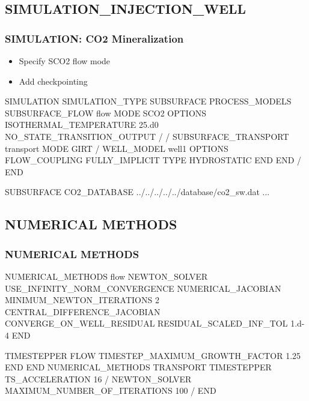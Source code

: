 \documentclass{beamer}
\begin{document}
\subsection{SIMULATION\_INJECTION\_WELL}

\begin{frame}\frametitle{SIMULATION: CO2 Mineralization}

\begin{itemize}
\item Specify SCO2 flow mode
\item Add checkpointing
\end{itemize}


\begin{semiverbatim}
SIMULATION
  SIMULATION_TYPE SUBSURFACE
  PROCESS_MODELS
    SUBSURFACE_FLOW flow
      MODE SCO2
      OPTIONS
        ISOTHERMAL_TEMPERATURE 25.d0
        NO_STATE_TRANSITION_OUTPUT
      /
    /
    SUBSURFACE_TRANSPORT transport
      MODE GIRT
    /
\newpage
    WELL_MODEL well1
      OPTIONS
        FLOW_COUPLING FULLY_IMPLICIT
        TYPE HYDROSTATIC
      END
    END
  /
END

SUBSURFACE
CO2_DATABASE ../../../../../database/co2_sw.dat
...

\end{semiverbatim}

\end{frame}

\subsection{NUMERICAL METHODS}
\begin{frame}\frametitle{NUMERICAL METHODS}

\begin{semiverbatim}
NUMERICAL_METHODS flow
  NEWTON_SOLVER
    USE_INFINITY_NORM_CONVERGENCE
    NUMERICAL_JACOBIAN
    MINIMUM_NEWTON_ITERATIONS 2
    CENTRAL_DIFFERENCE_JACOBIAN
    CONVERGE_ON_WELL_RESIDUAL
    RESIDUAL_SCALED_INF_TOL 1.d-4
  END

  TIMESTEPPER FLOW
    TIMESTEP_MAXIMUM_GROWTH_FACTOR 1.25
  END
END
\newpage
NUMERICAL_METHODS TRANSPORT
  TIMESTEPPER
    TS_ACCELERATION 16
  /
  NEWTON_SOLVER
    MAXIMUM_NUMBER_OF_ITERATIONS 100
  /
END

\end{semiverbatim}
\end{frame}
\end{document}
